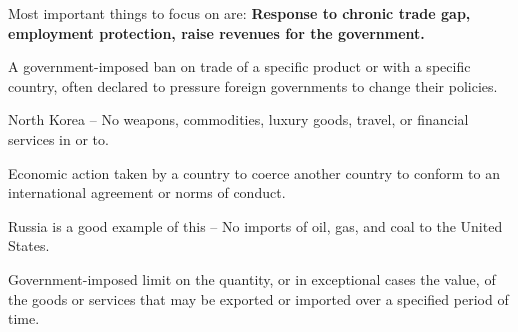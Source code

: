 Most important things to focus on are: \textbf{Response to chronic trade gap, 
employment protection, raise revenues for the government.}

\begin{definition}
    A government-imposed ban on trade of a specific product or with a specific country, 
    often declared to pressure foreign governments to change their policies.
\end{definition}

North Korea -- No weapons, commodities, luxury goods, travel, or financial services in or to.

\begin{definition}
    Economic action taken by a country to coerce another country to conform to an 
    international agreement or norms of conduct.
\end{definition}

Russia is a good example of this -- No imports of oil, gas, and coal to the United States.

\begin{definition}
    Government-imposed limit on the quantity, or in exceptional cases the value, 
    of the goods or services that may be exported or imported over a specified period of time.
\end{definition}
